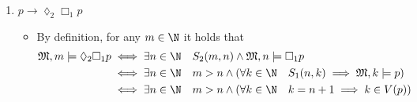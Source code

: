 \documentclass[a4paper, 12pt]{report}
\begin{document}
{\begin{enumerate}[label=(\alph*)]
\begin{itemize}
                    \item By definition, for any $s \in \mathbb B$ it holds that
                        \begin{equation*}
                            \begin{split}
                                \mathfrak M', s \models \lozenge_1 \Box_2 p &\iff \exists t \in \mathbb B \quad R_1(s, t) \land \mathfrak M', t \models \Box_2 p \\
                                                                           &\iff \exists t \in \mathbb B \quad (t = s0 \lor t = s1) \land (\forall u \in \mathbb B \quad R_2(t, u) \implies \mathfrak M', u \models p) \\
                                                                           &\iff \exists t \in \mathbb B \quad (t = s0 \lor t = s1) \land (\forall u \in \mathbb B \quad u \sqsubset t \implies u \in V(p))
                            \end{split}
                        \end{equation*}
                        Now take $s = 00 \in \mathbb B$, and suppose $V(p) = \{s\} = \{00\}$; then $s \in V(p) \iff \mathfrak M', s \models p$, however if $t = s0$ or $t = s1$, there still is $u = 0$ such that $u = 0\sqsubset 00 = t$ even though $u = 0 \notin V(p)$, therefore $(t = s0 \lor t = s1) \implies (\exists u \in \mathbb B \quad u \sqsubset t \land u \notin V(p)) \iff \mathfrak M', s \not\models \lozenge_1 \Box_2 p$ which implies that the formula is not valid on $\mathcal B$.
                \end{itemize}
            \item $p \rightarrow \lozenge_2 \Box_1 p$
                \begin{itemize}
                    \item By definition, for any $m \in \N$ it holds that
                        \begin{equation*}
                            \begin{split}
                                \mathfrak M, m \models \lozenge_2 \Box_1 p &\iff \exists n \in \N \quad S_2(m, n) \land \mathfrak M, n \models \Box_1 p \\
                                                                           &\iff \exists n \in \N \quad m > n \land (\forall k \in \N \quad S_1(n, k) \implies \mathfrak M, k \models p) \\
                                                                           &\iff \exists n \in \N \quad m > n \land (\forall k \in \N \quad k = n + 1 \implies k \in V(p)) \\

\end{split}
\end{equation*}
\end{itemize}
\end{enumerate}}
\end{document}
